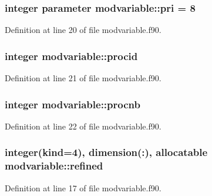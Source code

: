 \subsubsection[{\texorpdfstring{pri}{pri}}]{\setlength{\rightskip}{0pt plus 5cm}integer parameter modvariable\+::pri = 8}\hypertarget{namespacemodvariable_aa1399b6a91a8f18eb517445b0af8533e}{}\label{namespacemodvariable_aa1399b6a91a8f18eb517445b0af8533e}


Definition at line 20 of file modvariable.\+f90.

\subsubsection[{\texorpdfstring{procid}{procid}}]{\setlength{\rightskip}{0pt plus 5cm}integer modvariable\+::procid}\hypertarget{namespacemodvariable_af640fc287249ccc7e43133f74d704cf5}{}\label{namespacemodvariable_af640fc287249ccc7e43133f74d704cf5}


Definition at line 21 of file modvariable.\+f90.

\subsubsection[{\texorpdfstring{procnb}{procnb}}]{\setlength{\rightskip}{0pt plus 5cm}integer modvariable\+::procnb}\hypertarget{namespacemodvariable_a77ab6ce14a18f48d9c5f3ccd1f1cf044}{}\label{namespacemodvariable_a77ab6ce14a18f48d9c5f3ccd1f1cf044}


Definition at line 22 of file modvariable.\+f90.

\subsubsection[{\texorpdfstring{refined}{refined}}]{\setlength{\rightskip}{0pt plus 5cm}integer(kind=4), dimension(\+:), allocatable modvariable\+::refined}\hypertarget{namespacemodvariable_a8de6519433943eabe03c631fdab15e67}{}\label{namespacemodvariable_a8de6519433943eabe03c631fdab15e67}


Definition at line 17 of file modvariable.\+f90.

